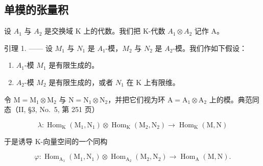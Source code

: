 \subsection{单模的张量积}

设 \(A_{1}\) 与 \(A_{2}\) 是交换域 K 上的代数。我们把 K-代数 \(A_{1} \otimes A_{2}\) 记作 A。

引理 1. —— 设 \(M_{1}\) 与 \(N_{1}\) 是 \(A_{1}\)-模，\(M_{2}\) 与 \(N_{2}\) 是 \(A_{2}\)-模。我们作如下假设：

\begin{enumerate}
\def\labelenumi{(\roman{enumi})}
\item
  \(A_{1}\)-模 \(M_{1}\) 是有限生成的。
\item
  \(A_{2}\)-模 \(M_{2}\) 是有限生成的，或者 \(N_{1}\) 在 K 上有限维。
\end{enumerate}

令 \(\mathrm{M} = \mathrm{M}_1\otimes \mathrm{M}_2\) 与 \(\mathrm{N} = \mathrm{N}_1\otimes \mathrm{N}_2\)，并把它们视为环 \(\mathrm{A} = \mathrm{A}_1\otimes \mathrm{A}_2\) 上的模。典范同态（II, §3, No.~5, 第 251 页）

\[
\lambda : \operatorname{Hom} _ {\mathrm{K}} (\mathrm{M} _ {1}, \mathrm{N} _ {1}) \otimes \operatorname{Hom} _ {\mathrm{K}} (\mathrm{M} _ {2}, \mathrm{N} _ {2}) \longrightarrow \operatorname{Hom} _ {\mathrm{K}} (\mathrm{M}, \mathrm{N})
\]

于是诱导 K-向量空间的一个同构

\[
\varphi : \operatorname{Hom} _ {\mathrm{A} _ {1}} (\mathrm{M} _ {1}, \mathrm{N} _ {1}) \otimes \operatorname{Hom} _ {\mathrm{A} _ {2}} (\mathrm{M} _ {2}, \mathrm{N} _ {2}) \longrightarrow \operatorname{Hom} _ {\mathrm{A}} (\mathrm{M}, \mathrm{N}).
\]

